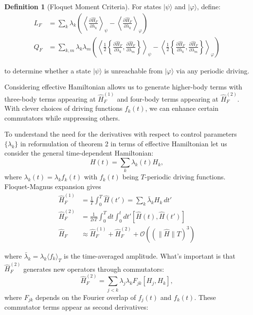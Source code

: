 \documentclass[ a4paper, 
                amsfonts, 
                amssymb, 
                amsmath, 
                reprint, 
                showkeys, 
                nofootinbib,
                superscriptaddress, 
                onecolumn, 
                notitlepage,
                aps,
                pra,
                longbibliography]{revtex4-1}
\theoremstyle{definition}
\newtheorem{definition}{Definition}[section]
\begin{document}
\begin{definition}[Floquet Moment Criteria]
For states $|\psi\rangle$ and $|\varphi\rangle$, define:
\begin{align}
L_F &= \sum_k \lambda_k \left( \left\langle \frac{\partial \hat{H}_F}{\partial \lambda_k} \right\rangle_\psi - \left\langle \frac{\partial \hat{H}_F}{\partial \lambda_k} \right\rangle_\varphi \right) \\
Q_F &= \sum_{k,m} \lambda_k \lambda_m \left( \left\langle \frac{1}{2}\left\{\frac{\partial \hat{H}_F}{\partial \lambda_k}, \frac{\partial \hat{H}_F}{\partial \lambda_m}\right\} \right\rangle_\psi - \left\langle \frac{1}{2}\left\{\frac{\partial \hat{H}_F}{\partial \lambda_k}, \frac{\partial \hat{H}_F}{\partial \lambda_m}\right\} \right\rangle_\varphi \right)
\end{align}


to determine whether a state $|\psi\rangle$ is unreachable from $|\varphi\rangle$ via any periodic driving.
\end{definition}


Considering effective Hamiltonian  allows us to generate higher-body terms with three-body terms appearing at $\hat{H}_F^{(1)}$ and four-body terms appearing at $\hat{H}_F^{(2)}$.
With clever choices of driving functions $f_k(t)$, we can enhance certain commutators while suppressing others.

To understand the need for the derivatives with respect to control parameters $\{\lambda_k\}$ in reformulation of theorem 2 in terms of effective Hamiltonian let us consider the general time-dependent Hamiltonian:
\begin{equation}
H(t) = \sum_k \lambda_k(t) H_k,
\end{equation}
where $\lambda_k(t) = \lambda_k f_k(t)$ with $f_k(t)$ being $T$-periodic driving functions. Floquet-Magnus expansion gives
\begin{align}
\hat{H}_F^{(1)} &= \frac{1}{T}\int_0^T \hat{H}(t') = \sum_k \bar{\lambda}_k H_k\, dt'\\
\hat{H}_F^{(2)} &= \frac{1}{2iT}\int_0^T dt \int_0^t dt' \left[\hat{H}(t), \hat{H}(t')\right] \\
\hat{H}_F &\approx \hat{H}_F^{(1)} + \hat{H}_F^{(2)} + \mathcal{O}\left((\|\hat{H}\|T)^3\right)
\end{align}

where $\bar{\lambda}_k = \lambda_k \langle f_k \rangle_T$ is the time-averaged amplitude.
What's important is that $\hat{H}_F^{(2)} $
generates new operators through commutators:
\begin{equation}
\hat{H}_F^{(2)} = \sum_{j<k} \lambda_j \lambda_k F_{jk} [H_j, H_k],
\end{equation}
where $F_{jk}$ depends on the Fourier overlap of $f_j(t)$ and $f_k(t)$. These commutator terms appear as second derivatives:
\end{document}
